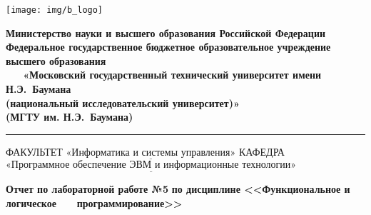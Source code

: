 \documentclass[12pt]{report}
\begin{document}
	\thispagestyle{empty}
	\begin{titlepage}
		\noindent \begin{minipage}{0.15\textwidth}
			\texttt{[image: img/b\_logo]}
		\end{minipage}
		\noindent\begin{minipage}{0.9\textwidth}\centering
			\textbf{Министерство науки и высшего образования Российской Федерации}\\
			\textbf{Федеральное государственное бюджетное образовательное учреждение высшего образования}\\
			\textbf{~~~«Московский государственный технический университет имени Н.Э.~Баумана}\\
			\textbf{(национальный исследовательский университет)»}\\
			\textbf{(МГТУ им. Н.Э.~Баумана)}
		\end{minipage}
		
		\noindent\rule{18cm}{3pt}
		\newline\newline
		\noindent ФАКУЛЬТЕТ $\underline{\text{«Информатика и системы управления»}}$ \newline\newline
		\noindent КАФЕДРА $\underline{\text{«Программное обеспечение ЭВМ и информационные технологии»}}$\newline\newline\newline\newline\newline
		
		\begin{center}
			\noindent\begin{minipage}{1.1\textwidth}\centering
				\Large\textbf{  Отчет по лабораторной работе №5}\newline
				\textbf{по дисциплине <<Функциональное и логическое}\newline
				\textbf{~~~программирование>>}\newline\newline
			\end{minipage}
		\end{center}
		

\end{titlepage}
\end{document}
